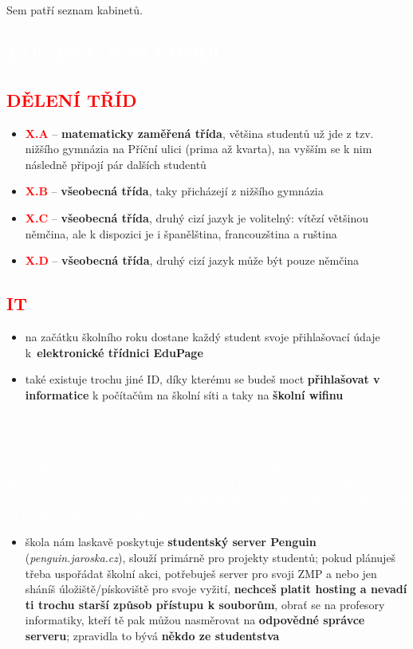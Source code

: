 \documentclass{article}
\newcommand{\nadpis}[1]{
  \vspace*{-60pt}
  \begin{nadpisbox}
    \vspace*{20pt}
    \centering \section*{\textcolor{white}{#1}}
  \end{nadpisbox}
}
\newcommand{\podnadpis}[1]{
  \subsection*{\textcolor{red}{#1}}
}
\begin{document}
Sem patří seznam kabinetů.
\newpage

\nadpis{JAK TO U NÁS CHODÍ}
\noindent \podnadpis{DĚLENÍ TŘÍD}
\begin{itemize}[leftmargin=10pt]
  \item \textcolor{red}{\textbf{X.A}} --  \textbf{matematicky zaměřená třída}, většina studentů už jde z tzv. nižšího gymnázia na Příční ulici (prima až kvarta), na vyšším se k nim následně připojí pár dalších studentů
  \item \textcolor{red}{\textbf{X.B}} -- \textbf{všeobecná třída}, taky přicházejí z nižšího gymnázia
  \item \textcolor{red}{\textbf{X.C}} -- \textbf{všeobecná třída}, druhý cizí jazyk je volitelný: vítězí většinou němčina, ale
k dispozici je i španělština, francouzština a ruština
  \item \textcolor{red}{\textbf{X.D}} -- \textbf{všeobecná třída}, druhý cizí jazyk může být pouze němčina
\end{itemize}
\podnadpis{IT}
\begin{itemize}[leftmargin=10pt]
  \item na začátku školního roku dostane každý student svoje přihlašovací údaje k~\textbf{elektronické třídnici EduPage}
  \item také existuje trochu jiné ID, díky kterému se budeš moct \textbf{přihlašovat v informatice} k počítačům na školní síti a taky na \textbf{školní wifinu}
\end{itemize}

\begin{redbox}
    \textcolor{white}{S připojováním osobních notebooků na školní wifi to bývalo v minulosti trochu složitější. Naštěstí v minulém školním roce naše zastaralá síť přošla značnými úpravami, takže už by to teď neměl být problém. Stačí se přihlásit na síť \textit{JAROSKA\_S} se stejným jménem a heslem, jako se přihlašuješ v informatice. Pokud si heslo na počítač změníš, změní se ti i heslo na wifi! V případě, že něco nebude fungovat, zajdi za panem profesorem Blahou (jehož kabinet si můžeš najít na plánku školy) a popros ho o pomoc.}
\end{redbox}

\begin{itemize}[leftmargin=10pt]
  \item  škola nám laskavě poskytuje \textbf{studentský server Penguin} (\textit{penguin.jaroska.cz}), slouží primárně pro projekty studentů; pokud plánuješ třeba uspořádat školní akci, potřebuješ server pro svoji ZMP a nebo jen sháníš úložiště/pískoviště pro svoje vyžití, \textbf{nechceš platit hosting a nevadí ti trochu starší způsob přístupu k souborům}, obrať se na profesory informatiky, kteří tě pak můžou nasměrovat na \textbf{odpovědné správce serveru}; zpravidla to bývá \textbf{někdo ze studentstva}
\end{itemize}
\end{document}
